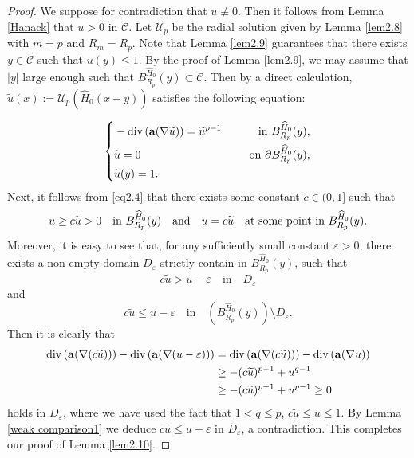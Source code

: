 \documentclass[12pt]{amsart}
\theoremstyle{definition}
\theoremstyle{remark}
\theoremstyle{conclusion}
\theoremstyle{conjecture}
\numberwithin{equation}{section}
\begin{document}
\begin{proof}
We suppose for contradiction that $u\not\equiv 0$. Then it follows from Lemma \ref{Hanack} that $u>0$ in $\mathcal{C}$. Let $\mathcal{U}_p$ be the radial solution given by Lemma \ref{lem2.8} with $m=p$ and $R_m=R_p$. Note that Lemma \ref{lem2.9} guarantees that there exists $y\in\mathcal{C}$ such that $u(y)\leq1$. By the proof of Lemma \ref{lem2.9}, we may assume that $|y|$ large enough such that $B^{\widehat{H}_0}_{R_p}(y)\subset\mathcal{C}$. Then by a direct calculation, $\widetilde{u}(x):=\mathcal{U}_p(\widehat{H}_0(x-y))$ satisfies the following equation:

\begin{equation}\label{eq2.4}
    \left\{
        \begin{aligned}
        &-\operatorname{div}\left({\bf{a}}(\nabla \widetilde{u})\right)=\widetilde{u}^{p-1} \quad\,\,\, &{\rm{in}} \,\, B^{\widehat{H}_0}_{R_p}(y), \\
        &\widetilde{u} =0 \quad\,\,\, &{\rm{on}} \,\, \partial B^{\widehat{H}_0}_{R_p}(y),\\
        &\widetilde{u}(y)=1.
        \end{aligned}
        \right.
  \end{equation}
Next, it follows from \eqref{eq2.4} that there exists some constant $c\in(0,1]$ such that
$$u\geq c\widetilde{u}>0\quad\text{in}\,\,B^{\widehat{H}_0}_{R_p}(y)\quad\text{and}\quad u=c\widetilde{u}\quad\text{at\,\,some\,\,point\,\,in}\,\, B^{\widehat{H}_0}_{R_p}(y).$$
Moreover, it is easy to see that, for any sufficiently small constant $\varepsilon>0$, there exists a non-empty domain $D_{\varepsilon}$ strictly contain in $B^{\widehat{H}_0}_{R_p}(y)$, such that
$$c\widetilde{u}>u-\varepsilon\quad\text{in}\quad D_{\varepsilon}$$
and
$$c\widetilde{u}\leq u-\varepsilon\quad\text{in}\quad \left(B^{\widehat{H}_0}_{R_p}(y)\right) \setminus D_{\varepsilon}.$$
Then it is clearly that
\begin{equation*}
  \begin{aligned}
  \operatorname{div}\left({\bf{a}}(\nabla (c\widetilde{u}))\right)-\operatorname{div}\left({\bf{a}}(\nabla (u-\varepsilon))\right)
  &=\operatorname{div}\left({\bf{a}}(\nabla (c\widetilde{u}))\right)-\operatorname{div}\left({\bf{a}}(\nabla u)\right)\\
  &\geq -(c\widetilde{u})^{p-1}+u^{q-1}\\
  &\geq -(c\widetilde{u})^{p-1}+u^{p-1}\geq0
  \end{aligned}
\end{equation*}
holds in $D_{\varepsilon}$, where we have used the fact that $1<q\leq p$, $c\widetilde{u}\leq u\leq1$. By Lemma \ref{weak comparison1} we deduce $c\widetilde{u}\leq u-\varepsilon$ in $D_{\varepsilon}$, a contradiction. This completes our proof of Lemma \ref{lem2.10}.

\end{proof}
\end{document}
